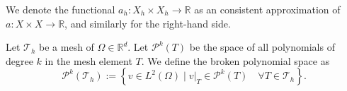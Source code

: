 We denote the functional $a_{h}: X_{h} \times X_{h} \to \mathbb{R} $ as an consistent approximation of $a: X \times X \to \mathbb{R} $, and similarly for the right-hand side.


\begin{definition}
    Let $\mathcal{T}_{h} $ be a mesh of $\Omega \in \mathbb{R} ^{d} $. Let $\mathcal{P}^{k}(T) $ be the space of all polynomials of degree $k$ in the mesh element $T$. We define the broken polynomial space as \[
    \mathcal{P}^{k} ( \mathcal{T}_{h} ) := \left\{ v \in L^2( \Omega )  \mid  v|_{T} \in \mathcal{P}^k( T) \quad  \forall T \in  \mathcal{T}_{h}   \right\}.
    \]
\end{definition}





